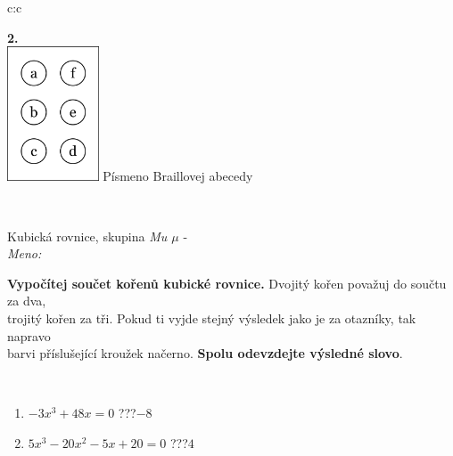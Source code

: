 \documentclass[10pt]{report}
\begin{document}
\begin{tabular}{c:c}
\begin{minipage}[c][104.5mm][t]{0.5\linewidth}
\begin{center}
\begin{minipage}{0.79\linewidth}
\begin{center}
\begin{varwidth}{\linewidth}
\begin{enumerate}
\end{enumerate}
\end{varwidth}
\end{center}
\end{minipage}
\begin{minipage}{0.20\linewidth}
\begin{center}
{\Huge\bfseries 2.} \\[2mm]
\includegraphics[height=40mm]{../images/braille.png}
{\small Písmeno Braillovej abecedy}
\end{center}
\end{minipage}
\end{center}
\end{minipage}
\\ \hdashline
\begin{minipage}[c][104.5mm][t]{0.5\linewidth}
\begin{center}
\vspace{7mm}
{\huge Kubická rovnice, skupina \textit{Mu $\mu$} -}\\[5mm]
\textit{Meno:}\phantom{xxxxxxxxxxxxxxxxxxxxxxxxxxxxxxxxxxxxxxxxxxxxxxxxxxxxxxxxxxxxxxxxx}\\[5mm]
\begin{minipage}{0.95\linewidth}
\textbf{Vypočítej součet kořenů kubické rovnice.} Dvojitý kořen považuj do součtu za dva,\\trojitý kořen za tři. Pokud ti vyjde stejný výsledek jako je za otazníky, tak napravo\\barvi příslušející kroužek načerno. \textbf{Spolu odevzdejte výsledné slovo}.
\end{minipage}
\\[1mm]
\begin{minipage}{0.79\linewidth}
\begin{center}
\begin{varwidth}{\linewidth}
\begin{enumerate}
\Large
\item $-3x^3+48x=0$\quad \dotfill\; ???\;\dotfill \quad $-8$
\item $5x^3-20x^2-5x+20=0$\quad \dotfill\; ???\;\dotfill \quad $4$

\end{enumerate}
\end{varwidth}
\end{center}
\end{minipage}
\end{center}
\end{minipage}
\end{tabular}
\end{document}
